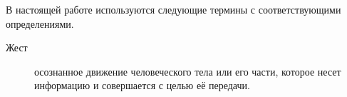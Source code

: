 \Defines %
В настоящей работе используются следующие термины с соответствующими определениями.
\begin{description}
	\item [Жест] осознанное движение человеческого тела или его части, которое несет информацию и совершается с целью её передачи.



\end{description}
